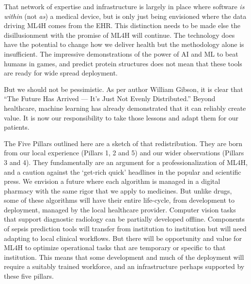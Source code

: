 That network of expertise and infrastructure is largely in place where
software \emph{is within} (not \emph{as}) a medical device, but is only
just being envisioned where the data driving ML4H comes from the EHR.
This distinction needs to be made else the disillusionment with the
promise of ML4H will continue. The technology does have the potential to
change how we deliver health but the methodology alone is insufficient.
The impressive demonstrations of the power of AI and ML to beat humans
in games, and predict protein structures does not mean that these tools
are ready for wide spread deployment.

But we should not be pessimistic. As per author William Gibson, it is
clear that ``The Future Has Arrived --- It's Just Not Evenly
Distributed.'' Beyond healthcare, machine learning has already
demonstrated that it can reliably create value.\citep{mcrae2015} It is
now our responsibility to take those lessons and adapt them for our
patients.

The Five Pillars outlined here are a sketch of that redistribution. They
are born from our local experience (Pillars 1, 2 and 5) and our wider
observations (Pillars 3 and 4). They fundamentally are an argument for a
professionalization of ML4H, and a caution against the `get-rich quick'
headlines in the popular and scientific press.\citep{bunz2022a} We
envision a future where each algorithm is managed in a digital pharmacy
with the same rigor that we apply to medicines. But unlike drugs, some
of these algorithms will have their entire life-cycle, from development
to deployment, managed by the local healthcare provider. Computer vision
tasks that support diagnostic radiology can be partially developed
offline. Components of sepsis prediction tools will transfer from
institution to institution but will need adapting to local clinical
workflows. But there will be opportunity and value for ML4H to optimize
operational tasks that are temporary or specific to that institution.
This means that some development and much of the deployment will require
a suitably trained workforce, and an infrastructure perhaps supported by
these five pillars.

